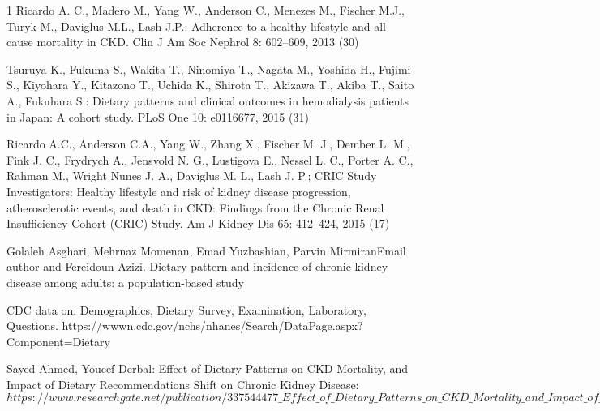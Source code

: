\begin{thebibliography}{1}
 Ricardo A. C., Madero M., Yang W., Anderson C., Menezes M., Fischer M.J., Turyk M., Daviglus M.L., Lash J.P.: Adherence to a healthy lifestyle and all-cause mortality in CKD. Clin J Am Soc Nephrol 8: 602–609, 2013 (30)

 Tsuruya K., Fukuma S., Wakita T., Ninomiya T., Nagata M., Yoshida H., Fujimi S., Kiyohara Y., Kitazono T., Uchida K., Shirota T., Akizawa T., Akiba T., Saito A., Fukuhara S.: Dietary patterns and clinical outcomes in hemodialysis patients in Japan: A cohort study. PLoS One 10: e0116677, 2015 (31)

 Ricardo A.C., Anderson C.A., Yang W., Zhang X., Fischer M. J., Dember L. M., Fink J. C., Frydrych A., Jensvold N. G., Lustigova E., Nessel L. C., Porter A. C., Rahman M., Wright Nunes J. A., Daviglus M. L., Lash J. P.;  CRIC Study Investigators: Healthy lifestyle and risk of kidney disease progression, atherosclerotic events, and death in CKD: Findings from the Chronic Renal Insufficiency Cohort (CRIC) Study. Am J Kidney Dis 65: 412–424, 2015 (17)

 Golaleh Asghari, Mehrnaz Momenan, Emad Yuzbashian, Parvin MirmiranEmail author and Fereidoun Azizi. Dietary pattern and incidence of chronic kidney disease among adults: a population-based study

 CDC data on: Demographics, Dietary Survey, Examination, Laboratory, Questions. https://wwwn.cdc.gov/nchs/nhanes/Search/DataPage.aspx?Component=Dietary


 Sayed Ahmed, Youcef Derbal: Effect of Dietary Patterns on CKD Mortality, and Impact of Dietary Recommendations Shift on Chronic Kidney Disease: $https://www.researchgate.net/publication/337544477\_Effect\_of \_Dietary\_Patterns\_on \_CKD\_Mortality \_and \_Impact\_of\_Dietary
\_Recommendations \_Shift\_on\_Chronic\_Kidney \_Disease$








\end{thebibliography}